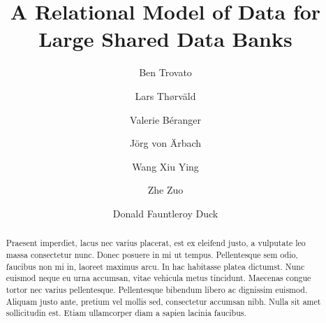 \documentclass[sigconf, nonacm]{acmart}
\begin{document}
\title{A Relational Model of Data for Large Shared Data Banks}

\author{Ben Trovato}

\author{Lars Th{\o}rv{\"a}ld}

\author{Valerie B\'eranger}

\author{J\"org von \"Arbach}

\author{Wang Xiu Ying}
\author{Zhe Zuo}

\author{Donald Fauntleroy Duck}

\begin{abstract}
Praesent imperdiet, lacus nec varius placerat, est ex eleifend justo, a vulputate leo massa consectetur nunc. Donec posuere in mi ut tempus. Pellentesque sem odio, faucibus non mi in, laoreet maximus arcu. In hac habitasse platea dictumst. Nunc euismod neque eu urna accumsan, vitae vehicula metus tincidunt. Maecenas congue tortor nec varius pellentesque. Pellentesque bibendum libero ac dignissim euismod. Aliquam justo ante, pretium vel mollis sed, consectetur accumsan nibh. Nulla sit amet sollicitudin est. Etiam ullamcorper diam a sapien lacinia faucibus.
\end{abstract}

\maketitle
\end{document}
